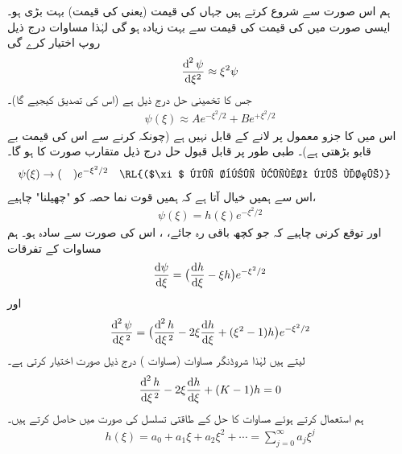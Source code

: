 ہم  اس صورت سے شروع کرتے ہیں جہاں  کی قیمت (یعنی  کی قیمت) بہت بڑی ہو۔ ایسی صورت میں
 کی قیمت  کی قیمت سے بہت زیادہ ہو گی لہٰذا مساوات  درج ذیل روپ اختیار کرے گی
\begin{align}
\frac{\dif^{\,2}\psi}{\dif \xi^{2}}\approx \xi^{2}\psi
\end{align}
جس کا تخمینی حل درج ذیل ہے (اس کی تصدیق کیجیے گا)۔ 
\begin{align}
\psi(\xi)\approx Ae^{-\xi^{2}/2}+Be^{+\xi^{2}/2}
\end{align}
 اس میں  کا جزو معمول پر لانے کے قابل نہیں ہے  (چونکہ   کرنے سے اس کی قیمت بے قابو بڑھتی ہے)۔ طبی طور پر قابل قبول حل درج ذیل متقارب صورت کا ہو گا۔
\begin{align}
\psi(\xi)&\to(\quad )e^{-\xi^{2}/2}&&\text{\RL{($\xi$ کی بڑی قیمت کے لئے)}}
\end{align}
اس سے ہمیں خیال آتا ہے کہ ہمیں قوت نما حصہ کو "چھیلنا"  چاہیے،
\begin{align}\label{مساوات_شروڈنگر_متقارب_الف}
\psi(\xi)=h(\xi)e^{-\xi^{2}/2}
\end{align}
اور توقع کرنی چاہیے کہ جو کچھ باقی رہ جائے، ، اس کی  صورت  سے سادہ ہو۔ ہم مساوات  کے تفرقات
\begin{align*}
\frac{\dif{\psi}}{\dif{\xi}}=\big(\frac{\dif{h}}{\dif{\xi}}-\xi h\big )e^{-\xi^{2}/2}
\end{align*}
اور
\begin{align*}
\frac{\dif^{\,2}{\psi}}{\dif{\xi^{\,2}}}=\big (\frac{\dif^{\,2}{h}}{\dif{\xi^{\,2}}}-2\xi\frac{\dif{h}}{\dif{\xi}}+(\xi^{2}-1)h\big )e^{-\xi^{2}/2}
\end{align*}
 لیتے ہیں لہٰذا شروڈنگر مساوات (مساوات ) درج ذیل صورت اختیار کرتی ہے۔
\begin{align}\label{مساوات_شروڈنگر_فروبنیوس_الف}
\frac{\dif^{\,2}{h}}{\dif{\xi^{\,2}}}-2\xi\frac{\dif{h}}{\dif{\xi}}+(K-1)h=0
\end{align}
ہم  استعمال کرتے ہوئے مساوات  کا حل  کے طاقتی تسلسل کی صورت میں حاصل کرتے ہیں۔ 
\begin{align}
h(\xi)=a_{0}+a_{1}\xi+a_{2}\xi^{2}+\cdots = \sum_{j=0}^{\infty}a_{j}\xi^{j}
\end{align}
